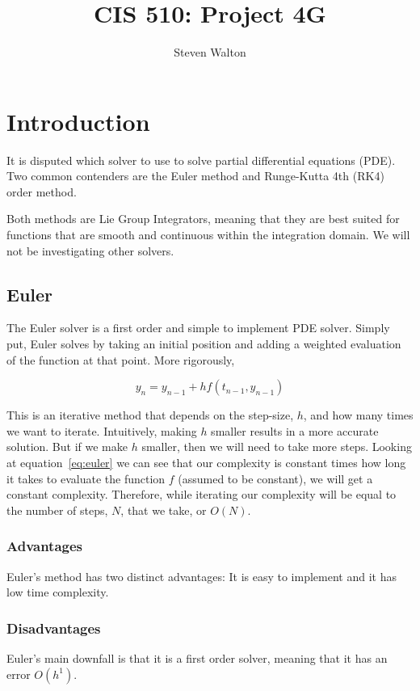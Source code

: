 \documentclass[12pt,letter]{article}
\begin{document}
\title{CIS 510: Project 4G}
\author{Steven Walton}
\maketitle

\section{Introduction} It is disputed which solver to use to solve partial
differential equations (PDE). Two common contenders are the Euler method and
Runge-Kutta 4th (RK4) order method. 

Both methods are Lie Group Integrators, meaning that they are best suited for
functions that are smooth and continuous within the integration domain. We will
not be investigating other solvers.

\subsection{Euler}
The Euler solver is a first order and simple to implement PDE solver. Simply
put, Euler solves by taking an initial position and adding a weighted evaluation
of the function at that point. More rigorously,

\begin{equation}\label{eq:euler}
    y_n = y_{n-1} + hf(t_{n-1}, y_{n-1})
\end{equation}

This is an iterative method that depends on the step-size, $h$, and how many
times we want to iterate. Intuitively, making $h$ smaller results in a more
accurate solution. But if we make $h$ smaller, then we will need to take more
steps. Looking at equation~\ref{eq:euler} we can see that our complexity is
constant times how long it takes to evaluate the function $f$ (assumed to be
constant), we will get a constant complexity. Therefore, while iterating our
complexity will be equal to the number of steps, $N$, that we take, or $O(N)$.

\subsubsection{Advantages}
Euler's method has two distinct advantages: It is easy to implement and it has
low time complexity.

\subsubsection{Disadvantages}
Euler's main downfall is that it is a first order solver, meaning that it has an
error $O(h^1)$.
\end{document}
